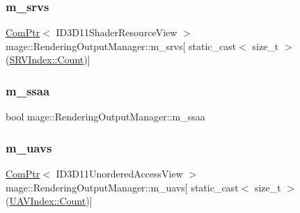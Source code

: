 \hypertarget{classmage_1_1_rendering_output_manager_af0443196d91297ccaff675a90a69adff}{}\label{classmage_1_1_rendering_output_manager_af0443196d91297ccaff675a90a69adff} 
\subsubsection{\texorpdfstring{m\+\_\+srvs}{m\_srvs}}
{\footnotesize\ttfamily \hyperlink{namespacemage_ae74f374780900893caa5555d1031fd79}{Com\+Ptr}$<$ I\+D3\+D11\+Shader\+Resource\+View $>$ mage\+::\+Rendering\+Output\+Manager\+::m\+\_\+srvs\mbox{[} static\+\_\+cast$<$ size\+\_\+t $>$(\hyperlink{classmage_1_1_rendering_output_manager_ab23ee4985ed0d176479fe796dc3a4cfdae93f994f01c537c4e2f7d8528c3eb5e9}{S\+R\+V\+Index\+::\+Count})\mbox{]}\hspace{0.3cm}{\ttfamily [private]}}

\hypertarget{classmage_1_1_rendering_output_manager_a944bc441357c9e1b6af74ec5c393fb63}{}\label{classmage_1_1_rendering_output_manager_a944bc441357c9e1b6af74ec5c393fb63} 
\subsubsection{\texorpdfstring{m\+\_\+ssaa}{m\_ssaa}}
{\footnotesize\ttfamily bool mage\+::\+Rendering\+Output\+Manager\+::m\+\_\+ssaa\hspace{0.3cm}{\ttfamily [private]}}

\hypertarget{classmage_1_1_rendering_output_manager_ad4e780e6340b18f601a1fcfa9dd1b297}{}\label{classmage_1_1_rendering_output_manager_ad4e780e6340b18f601a1fcfa9dd1b297} 
\subsubsection{\texorpdfstring{m\+\_\+uavs}{m\_uavs}}
{\footnotesize\ttfamily \hyperlink{namespacemage_ae74f374780900893caa5555d1031fd79}{Com\+Ptr}$<$ I\+D3\+D11\+Unordered\+Access\+View $>$ mage\+::\+Rendering\+Output\+Manager\+::m\+\_\+uavs\mbox{[} static\+\_\+cast$<$ size\+\_\+t $>$(\hyperlink{classmage_1_1_rendering_output_manager_a222cae54b40bbb153da0dfa840a37fdbae93f994f01c537c4e2f7d8528c3eb5e9}{U\+A\+V\+Index\+::\+Count})\mbox{]}\hspace{0.3cm}{\ttfamily [private]}}

